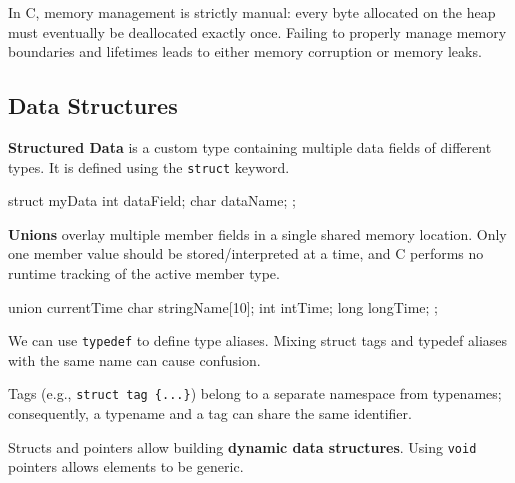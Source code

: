 \begin{important}
    In C, memory management is strictly manual: every byte allocated on the heap must eventually be deallocated exactly once. Failing to properly manage memory boundaries and lifetimes leads to either memory corruption or memory leaks.
\end{important}

\subsection{Data Structures}

\begin{definition}
    \textbf{Structured Data} is a custom type containing multiple data fields of different types. It is defined using the \texttt{struct} keyword.
\end{definition}

\begin{codeexample}
struct myData {
    int dataField;
    char dataName;
};
\end{codeexample}

\begin{definition}
    \textbf{Unions} overlay multiple member fields in a single shared memory location. Only one member value should be stored/interpreted at a time, and C performs no runtime tracking of the active member type.
\end{definition}

\begin{codeexample}
union currentTime {
    char stringName[10];
    int intTime;
    long longTime;
};
\end{codeexample}

\begin{remark}
    We can use \texttt{typedef} to define type aliases. Mixing struct tags and typedef aliases with the same name can cause confusion.
\end{remark}

\begin{remark}
    Tags (e.g., \texttt{struct tag \{...\}}) belong to a separate namespace from typenames; consequently, a typename and a tag can share the same identifier.
\end{remark}

\begin{remark}
    Structs and pointers allow building \textbf{dynamic data structures}. Using \texttt{void} pointers allows elements to be generic.
\end{remark}

